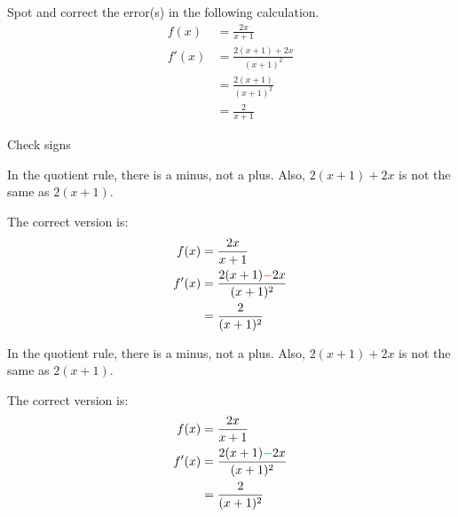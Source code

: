 %
%
\subsection*{\Conceptual}

\begin{Mquestion} Spot and correct the error(s) in the following calculation.
\begin{align*}
f(x)&=\frac{2x}{x+1}\\
f'(x)&=\frac{2(x+1)+2x}{(x+1)^2}\\
&=\frac{2(x+1)}{(x+1)^2}\\
&=\frac{2}{x+1}
\end{align*}
\end{Mquestion}
\begin{hint}  Check signs
\end{hint}
\begin{answer}   In the quotient rule, there is a minus, not a plus. Also, $2(x+1)+2x$ is not the same as $2(x+1)$.

 The correct version is:
\begin{align*}
f(x)&=\frac{2x}{x+1}\\
f'(x)&=\frac{2(x+1)\textcolor{red}{-}2x}{(x+1)^2}\\
&=\frac{2}{(x+1)^2}
\end{align*}
\end{answer}
\begin{solution}  In the quotient rule, there is a minus, not a plus. Also, $2(x+1)+2x$ is not the same as $2(x+1)$.

 The correct version is:
\begin{align*}
f(x)&=\frac{2x}{x+1}\\
f'(x)&=\frac{2(x+1)\textcolor{red}{-}2x}{(x+1)^2}\\
&=\frac{2}{(x+1)^2}
\end{align*}
\end{solution}
\subsection*{\Procedural}



